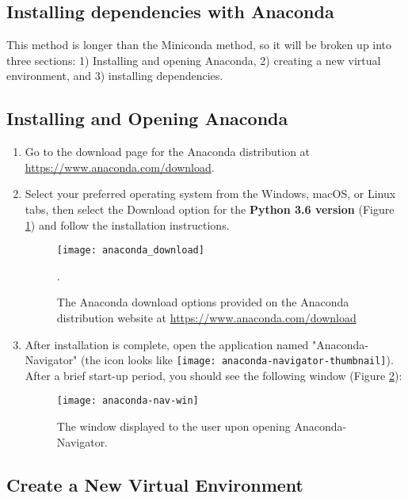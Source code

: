 \subsection{Installing dependencies with Anaconda}
This method is longer than the Miniconda method, so it will be broken up into three sections: 1) Installing and opening Anaconda, 2) creating a new virtual environment, and 3) installing dependencies.

\subsection*{Installing and Opening Anaconda}

\begin{enumerate}
    \item Go to the download page for the Anaconda distribution at \\ \url{https://www.anaconda.com/download}. 
    \item Select your preferred operating system from the Windows, macOS, or Linux tabs, then select the Download option for the \textbf{Python 3.6 version} (Figure \ref{anaconda_download}) and follow the installation instructions.
    \begin{figure}[h]
        \begin{center}
        \texttt{[image: anaconda\_download]}
        \caption{The Anaconda download options provided on the Anaconda distribution website at \protect \url{https://www.anaconda.com/download}}.
        \label{anaconda_download}
        \end{center}
    \end{figure}


    \item After installation is complete, open the application named "Anaconda-Navigator" (the icon looks like \texttt{[image: anaconda-navigator-thumbnail]}). After a brief start-up period, you should see the following window (Figure \ref{anaconda-nav-win}):
    \begin{figure}[htbp]
        \begin{center}
        \texttt{[image: anaconda-nav-win]}
        \caption{The window displayed to the user upon opening Anaconda-Navigator.}
        \label{anaconda-nav-win}
        \end{center}
    \end{figure}
\end{enumerate}

\subsection*{Create a New Virtual Environment}
    
